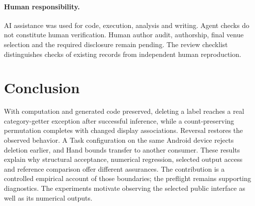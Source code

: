 \documentclass[10pt,conference]{IEEEtran}
\begin{document}
\paragraph{Human responsibility.}
AI assistance was used for code, execution, analysis and writing. Agent checks do not constitute human verification. Human author audit, authorship, final venue selection and the required disclosure remain pending. The review checklist distinguishes checks of existing records from independent human reproduction.

\section{Conclusion}
With computation and generated code preserved, deleting a label reaches a real category-getter exception after successful inference, while a count-preserving permutation completes with changed display associations. Reversal restores the observed behavior. A Task configuration on the same Android device rejects deletion earlier, and Hand bounds transfer to another consumer. These results explain why structural acceptance, numerical regression, selected output access and reference comparison offer different assurances. The contribution is a controlled empirical account of those boundaries; the preflight remains supporting diagnostics. The experiments motivate observing the selected public interface as well as its numerical outputs.
\end{document}
